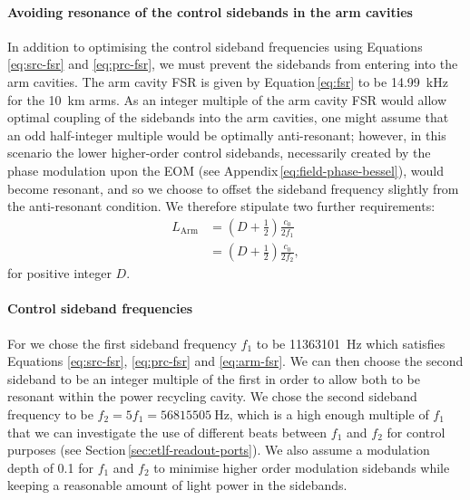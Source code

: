 \paragraph{Avoiding resonance of the control sidebands in the arm cavities}
In addition to optimising the control sideband frequencies using Equations \ref{eq:src-fsr} and \ref{eq:prc-fsr}, we must prevent the sidebands from entering into the arm cavities. The arm cavity \gls{FSR} is given by Equation\,\ref{eq:fsr} to be \SI{14.99}{\kilo\hertz} for the \SI{10}{\kilo\meter} arms. As an integer multiple of the arm cavity \gls{FSR} would allow optimal coupling of the sidebands into the arm cavities, one might assume that an odd half-integer multiple would be optimally anti-resonant; however, in this scenario the lower higher-order control sidebands, necessarily created by the phase modulation upon the \gls{EOM} (see Appendix\,\ref{eq:field-phase-bessel}), would become resonant, and so we choose to offset the sideband frequency slightly from the anti-resonant condition. We therefore stipulate two further requirements:
\begin{equation}
  \label{eq:arm-fsr}
  \begin{split}
    L_{\text{Arm}} &= \left(D + \frac{1}{2} \right) \frac{c_0}{2 f_1} \\
                   &= \left(D + \frac{1}{2} \right) \frac{c_0}{2 f_2},
  \end{split}
\end{equation}
for positive integer $D$.

\paragraph{Control sideband frequencies}
For \ETLF{} we chose the first sideband frequency $f_1$ to be \SI{11363101}{\hertz} which satisfies Equations \ref{eq:src-fsr}, \ref{eq:prc-fsr} and \ref{eq:arm-fsr}. We can then choose the second sideband to be an integer multiple of the first in order to allow both to be resonant within the power recycling cavity. We chose the second sideband frequency to be $f_2 = 5f_1 = \SI{56815505}{\hertz}$, which is a high enough multiple of $f_1$ that we can investigate the use of different beats between $f_1$ and $f_2$ for control purposes (see Section\,\ref{sec:etlf-readout-ports}). We also assume a modulation depth of \num{0.1} for $f_1$ and $f_2$ to minimise higher order modulation sidebands while keeping a reasonable amount of light power in the sidebands.

